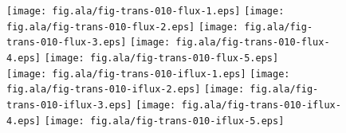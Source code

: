 \documentclass[aip,jcp,a4paper,preprint,onecolumn]{revtex4-1}
\begin{document}
\begin{figure}
  \centering
  \texttt{[image: fig.ala/fig-trans-010-flux-1.eps]}
  \texttt{[image: fig.ala/fig-trans-010-flux-2.eps]}
  \texttt{[image: fig.ala/fig-trans-010-flux-3.eps]}
  \texttt{[image: fig.ala/fig-trans-010-flux-4.eps]}
  \texttt{[image: fig.ala/fig-trans-010-flux-5.eps]}\\
  \texttt{[image: fig.ala/fig-trans-010-iflux-1.eps]}
  \texttt{[image: fig.ala/fig-trans-010-iflux-2.eps]}
  \texttt{[image: fig.ala/fig-trans-010-iflux-3.eps]}
  \texttt{[image: fig.ala/fig-trans-010-iflux-4.eps]}
  \texttt{[image: fig.ala/fig-trans-010-iflux-5.eps]}

\end{figure}
\end{document}

